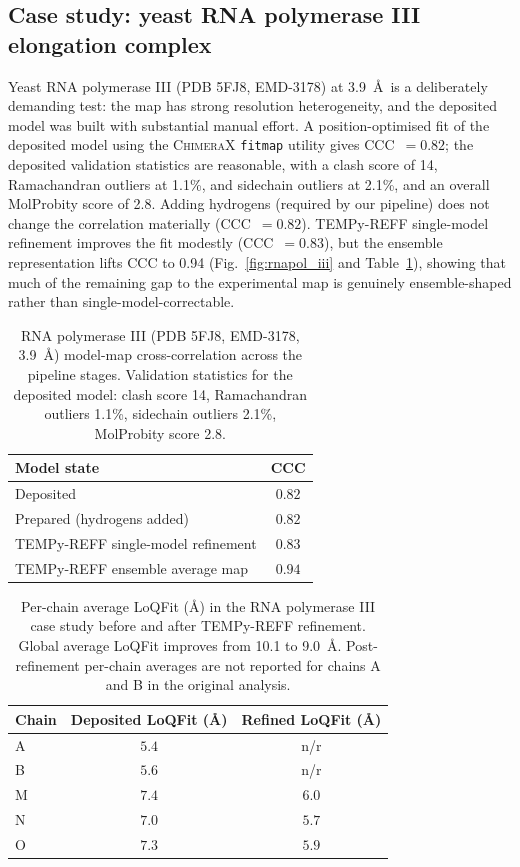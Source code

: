 \documentclass[11pt]{article}
\begin{document}
\subsection{Case study: yeast RNA polymerase III elongation complex}
Yeast RNA polymerase III (PDB 5FJ8, EMD-3178) at 3.9~\AA\ is a deliberately demanding test: the map has strong resolution heterogeneity, and the deposited model was built with substantial manual effort. A position-optimised fit of the deposited model using the \textsc{ChimeraX} \texttt{fitmap} utility gives CCC~$=0.82$; the deposited validation statistics are reasonable, with a clash score of 14, Ramachandran outliers at 1.1\%, and sidechain outliers at 2.1\%, and an overall MolProbity score of 2.8. Adding hydrogens (required by our pipeline) does not change the correlation materially (CCC~$=0.82$). TEMPy-REFF single-model refinement improves the fit modestly (CCC~$=0.83$), but the ensemble representation lifts CCC to 0.94 (Fig.~\ref{fig:rnapol_iii} and Table~\ref{tab:rnapoliii}), showing that much of the remaining gap to the experimental map is genuinely ensemble-shaped rather than single-model-correctable.

\begin{table}[t]
  \centering
  \caption{RNA polymerase III (PDB 5FJ8, EMD-3178, 3.9~\AA) model-map cross-correlation across the pipeline stages. Validation statistics for the deposited model: clash score 14, Ramachandran outliers 1.1\%, sidechain outliers 2.1\%, MolProbity score 2.8.}
  \label{tab:rnapoliii}
  \begin{tabular}{lc}
    \toprule
    Model state & CCC \\
    \midrule
    Deposited & $0.82$ \\
    Prepared (hydrogens added) & $0.82$ \\
    TEMPy-REFF single-model refinement & $0.83$ \\
    TEMPy-REFF ensemble average map & $0.94$ \\
    \bottomrule
  \end{tabular}
\end{table}

\begin{table}[t]
  \centering
  \caption{Per-chain average LoQFit (\AA) in the RNA polymerase III case study before and after TEMPy-REFF refinement. Global average LoQFit improves from 10.1 to 9.0~\AA. Post-refinement per-chain averages are not reported for chains A and B in the original analysis.}
  \label{tab:loqfit}
  \begin{tabular}{lcc}
    \toprule
    Chain & Deposited LoQFit (\AA) & Refined LoQFit (\AA) \\
    \midrule
    A & $5.4$ & n/r \\
    B & $5.6$ & n/r \\
    M & $7.4$ & $6.0$ \\
    N & $7.0$ & $5.7$ \\
    O & $7.3$ & $5.9$ \\
    \bottomrule
  \end{tabular}
\end{table}
\end{document}
